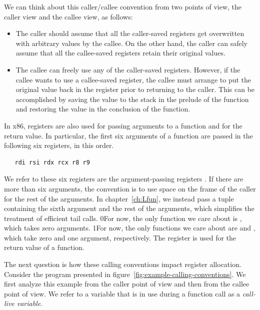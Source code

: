 \documentclass[7x10]{TimesAPriori_MIT}%
\def\racketEd{0}
\def\pythonEd{1}
\providecommand{\BookEdition}{1}
\let\edition\BookEdition
\newcommand{\racket}[1]{{\if\edition\racketEd{#1}\fi}}
\newcommand{\pythonColor}[0]{}
\newcommand{\python}[1]{{\if\edition\pythonEd\pythonColor #1\fi}}
\numberwithin{theorem}{chapter}
\numberwithin{definition}{chapter}
\numberwithin{equation}{chapter}
\begin{document}
We can think about this caller/callee convention from two points of
view, the caller view and the callee view, as follows:
\begin{itemize}
\item The caller should assume that all the caller-saved registers get
  overwritten with arbitrary values by the callee.  On the other hand,
  the caller can safely assume that all the callee-saved registers
  retain their original values.
\item The callee can freely use any of the caller-saved registers.
  However, if the callee wants to use a callee-saved register, the
  callee must arrange to put the original value back in the register
  prior to returning to the caller. This can be accomplished by saving
  the value to the stack in the prelude of the function and restoring
  the value in the conclusion of the function.
\end{itemize}

In x86, registers are also used for passing arguments to a function
and for the return value.  In particular, the first six arguments of a
function are passed in the following six registers, in this order.
\begin{lstlisting}
   rdi rsi rdx rcx r8 r9
\end{lstlisting}
We refer to these six registers are the argument-passing registers
.
If there are more than six arguments, the convention is to use space
on the frame of the caller for the rest of the arguments. In
chapter~\ref{ch:Lfun}, we instead pass a tuple containing the sixth
argument and the rest of the arguments, which simplifies the treatment
of efficient tail calls.
%
\racket{For now, the only function we care about is ,
  which takes zero arguments.}
%
\python{For now, the only functions we care about are \code{read\_int}
  and \code{print\_int}, which take zero and one argument, respectively.}
%
The register  is used for the return value of a function.

The next question is how these calling conventions impact register
allocation. Consider the \LangVar{} program presented in
figure~\ref{fig:example-calling-conventions}.  We first analyze this
example from the caller point of view and then from the callee point
of view. We refer to a variable that is in use during a function call
as a \emph{call-live variable}.
\end{document}
